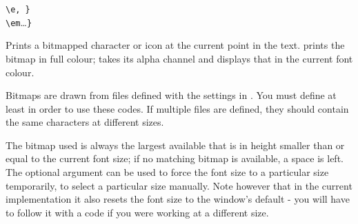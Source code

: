     \lstinline|\e|\rawlbrace{}\lstinline|,|~\lstinline|}|\\
    \lstinline|\em|\rawlbrace\ldots\lstinline|}|
    \begin{cmdesc}
      Prints a bitmapped character or icon at the current point in the text.
       prints the bitmap in full colour;   takes its alpha channel
      and displays that in the current font colour.

      Bitmaps are drawn from files defined with the 
      settings in \gameexe.  You must define at least  in order to
      use these codes.  If multiple files are defined, they should contain the
      same characters at different sizes.

      The bitmap used is always the largest available that is in height smaller
      than or equal to the current font size; if no matching bitmap is
      available, a space is left.  The optional  argument can be
      used to force the font size to a particular size temporarily, to select a
      particular size manually.  Note however that in the current implementation
      it also resets the font size to the window's default - you will have to
      follow it with a  code if you were working at a different
      size.
    \end{cmdesc}

